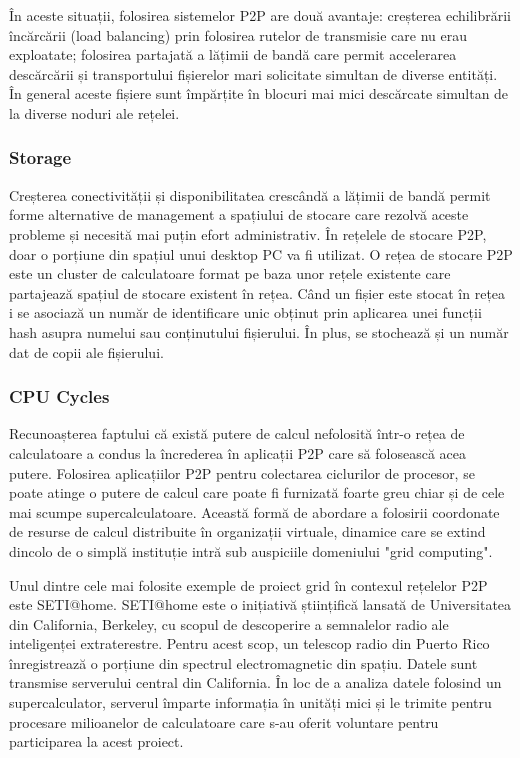În aceste situații, folosirea sistemelor P2P are două avantaje: creșterea
echilibrării încărcării (load balancing) prin folosirea rutelor de transmisie
care nu erau exploatate; folosirea partajată a lățimii de bandă care permit
accelerarea descărcării și transportului fișierelor mari solicitate simultan
de diverse entități. În general aceste fișiere sunt împărțite în blocuri mai
mici descărcate simultan de la diverse noduri ale rețelei.

\subsubsection{Storage}

Creșterea conectivității și disponibilitatea crescândă a lățimii de bandă
permit forme alternative de management a spațiului de stocare care rezolvă
aceste probleme și necesită mai puțin efort administrativ. În rețelele de
stocare P2P, doar o porțiune din spațiul unui desktop PC va fi utilizat. O
rețea de stocare P2P este un cluster de calculatoare format pe baza unor
rețele existente care partajează spațiul de stocare existent în rețea. Când un
fișier este stocat în rețea i se asociază un număr de identificare unic
obținut prin aplicarea unei funcții hash asupra numelui sau conținutului
fișierului. În plus, se stochează și un număr dat de copii ale fișierului.

\subsubsection{CPU Cycles}

Recunoașterea faptului că există putere de calcul nefolosită într-o rețea de
calculatoare a condus la încrederea în aplicații P2P care să folosească acea
putere. Folosirea aplicațiilor P2P pentru colectarea ciclurilor de procesor,
se poate atinge o putere de calcul care poate fi furnizată foarte greu chiar
și de cele mai scumpe supercalculatoare. Această formă de abordare a folosirii
coordonate de resurse de calcul distribuite în organizații virtuale, dinamice
care se extind dincolo de o simplă instituție intră sub auspiciile domeniului
"grid computing".

Unul dintre cele mai folosite exemple de proiect grid în contexul rețelelor
P2P este SETI@home. SETI@home este o inițiativă științifică lansată de
Universitatea din California, Berkeley, cu scopul de descoperire a semnalelor
radio ale inteligenței extraterestre. Pentru acest scop, un telescop radio din
Puerto Rico înregistrează o porțiune din spectrul electromagnetic din spațiu.
Datele sunt transmise serverului central din California. În loc de a analiza
datele folosind un supercalculator, serverul împarte informația în unități
mici și le trimite pentru procesare milioanelor de calculatoare care s-au
oferit voluntare pentru participarea la acest proiect.

